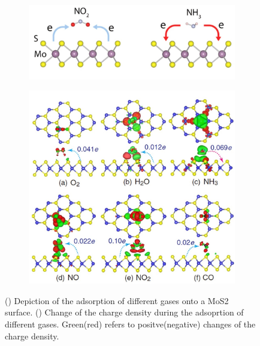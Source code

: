 \begin{figure}
\centering
\begin{subfigure}{0.49\textwidth}
    \includegraphics[width=\textwidth]{02_functionality/fig/adsorption.jpg}
    \caption{}
    \label{fig:adsorption_process}
\end{subfigure}
\begin{subfigure}{0.49\textwidth}
    \includegraphics[width=\textwidth]{02_functionality/fig/charge_density_change.jpg}
    \caption{}
    \label{fig:charge_density}
\end{subfigure}
\caption{() Depiction of the adsorption of different gases onto a MoS2 surface. \cite{Lee2018} () Change of the charge density during the adsoprtion of different gases. Green(red) refers to positve(negative) changes of the charge density. \cite{Lee2018}}
\label{fig:adsorption}
\end{figure}

